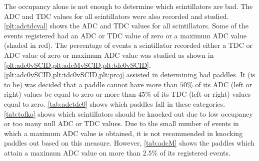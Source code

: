 The occupancy alone is not enough to determine which scintillators are bad. The ADC and TDC values for all scintillators were also recorded and studied. \ref{plt:adctdcval} shows the ADC and TDC values for all scintillators. Some of the events registered had an ADC or TDC value of zero or a maximum ADC value (shaded in red). The percentage of events a scintillator recorded either a TDC or ADC value of zero or maximum ADC value was studied as shown in \ref{plt:adc0vSCID,plt:adcMvSCID,plt:tdc0vSCID}. \ref{plt:adc0vSCID,plt:tdc0vSCID,plt:proj} assisted in determining bad paddles. It (is to be) was decided that a paddle cannot have more than $50\%$ of its ADC (left or right) values be equal to zero or more than $45\%$ of its TDC (left or right) values equal to zero. \ref{tab:adctdc0} shows which paddles fall in these categories. \ref{tab:tofko} shows which scintillators should be knocked out due to low occupancy or too many null ADC or TDC values. Due to the small number of events in which a maximum ADC value is obtained, it is not recommended in knocking paddles out based on this measure. However, \ref{tab:adcM} shows the paddles which attain a maximum ADC value on more than $2.5\%$ of its registered events.





